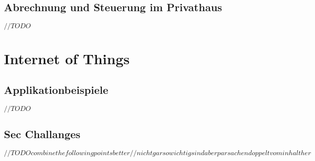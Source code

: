 \documentclass[a4paper, 12pt]{article}
\begin{document}
\subsection{Abrechnung und Steuerung im Privathaus}
$ //TODO $

\section{Internet of Things}
\subsection{Applikationbeispiele}
$ //TODO $
\subsection{Sec Challanges}
$ //TODO combine the following points better // nicht gar so wichtig sind aber par sachen doppelt vom inhalt her$
\end{document}

